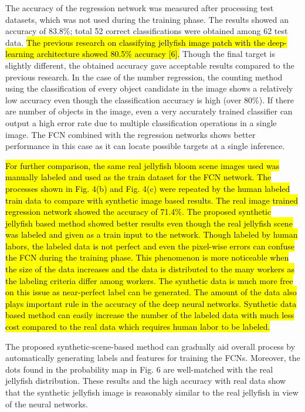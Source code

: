\documentclass{ieeeaccess}
\begin{document}
The accuracy of the regression network was measured after processing test datasets, which was not used during the training phase. The results showed an accuracy of 83.8\%; total 52 correct classifications were obtained among 62 test data. \hl{The previous research on classifying jellyfish image patch with the deep-learning architecture showed 80.5\% accuracy [6].} Though the final target is slightly different, the obtained accuracy gave acceptable results compared to the previous research. In the case of the number regression, the counting method using the classification of every object candidate in the image shows a relatively low accuracy even though the classification accuracy is high (over 80\%). If there are number of objects in the image, even a very accurately trained classifier can output a high error rate due to multiple classification operations in a single image. The FCN combined with the regression networks shows better performance in this case as it can locate possible targets at a single inference. 

\hl{For further comparison, the same real jellyfish bloom scene images used was manually labeled and used as the train dataset for the FCN network. The processes shown in Fig. 4(b) and Fig. 4(c) were repeated by the human labeled train data to compare with synthetic image based results. The real image trained regression network showed the accuracy of 71.4\%. The proposed synthetic jellyfish based method showed better results even though the real jellyfish scene was labeled and given as a train input to the network. Though labeled by human labors, the labeled data is not perfect and even the pixel-wise errors can confuse the FCN during the training phase. This phenomenon is more noticeable when the size of the data increases and the data is distributed to the many workers as the labeling criteria differ among workers. The synthetic data is much more free on this issue as near-perfect label can be generated. The amount of the data also plays important rule in the accuracy of the deep neural networks. Synthetic data based method can easily increase the number of the labeled data with much less cost compared to the real data which requires human labor to be labeled.}

The proposed synthetic-scene-based method can gradually aid overall process by automatically generating labels and features for training the FCNs. Moreover, the dots found in the probability map in Fig. 6 are well-matched with the real jellyfish distribution. These results and the high accuracy with real data show that the synthetic jellyfish image is reasonably similar to the real jellyfish in view of the neural networks.
\end{document}
